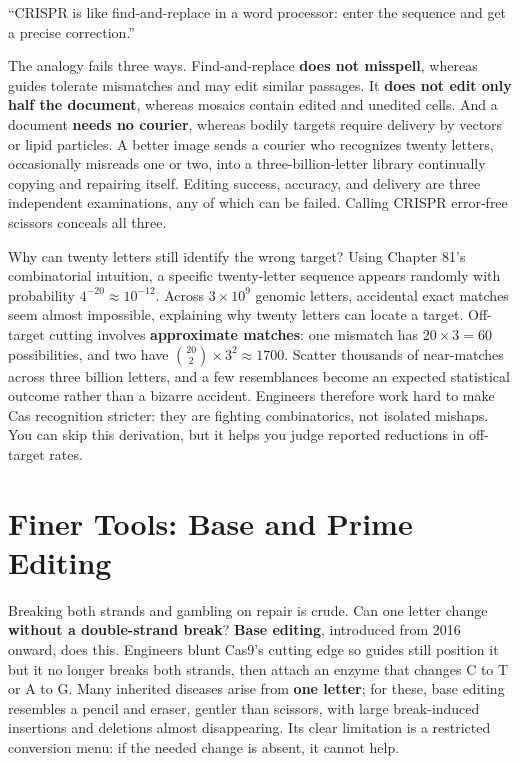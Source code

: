 \begin{wuqu}
``CRISPR is like find-and-replace in a word processor: enter the sequence and get a precise correction.''

The analogy fails three ways. Find-and-replace \textbf{does not misspell}, whereas guides tolerate mismatches and may edit similar passages. It \textbf{does not edit only half the document}, whereas mosaics contain edited and unedited cells. And a document \textbf{needs no courier}, whereas bodily targets require delivery by vectors or lipid particles. A better image sends a courier who recognizes twenty letters, occasionally misreads one or two, into a three-billion-letter library continually copying and repairing itself. Editing success, accuracy, and delivery are three independent examinations, any of which can be failed. Calling CRISPR error-free scissors conceals all three.
\end{wuqu}

\begin{tiaozhan}
Why can twenty letters still identify the wrong target? Using Chapter 81's combinatorial intuition, a specific twenty-letter sequence appears randomly with probability $4^{-20}\approx 10^{-12}$. Across $3\times 10^{9}$ genomic letters, accidental exact matches seem almost impossible, explaining why twenty letters can locate a target. Off-target cutting involves \textbf{approximate matches}: one mismatch has $20\times 3=60$ possibilities, and two have $\binom{20}{2}\times 3^2\approx 1700$. Scatter thousands of near-matches across three billion letters, and a few resemblances become an expected statistical outcome rather than a bizarre accident. Engineers therefore work hard to make Cas recognition stricter: they are fighting combinatorics, not isolated mishaps. You can skip this derivation, but it helps you judge reported reductions in off-target rates.
\end{tiaozhan}

\section{Finer Tools: Base and Prime Editing}

Breaking both strands and gambling on repair is crude. Can one letter change \textbf{without a double-strand break}? \textbf{Base editing}, introduced from 2016 onward, does this. Engineers blunt Cas9's cutting edge so guides still position it but it no longer breaks both strands, then attach an enzyme that changes C to T or A to G. Many inherited diseases arise from \textbf{one letter}; for these, base editing resembles a pencil and eraser, gentler than scissors, with large break-induced insertions and deletions almost disappearing. Its clear limitation is a restricted conversion menu: if the needed change is absent, it cannot help.

